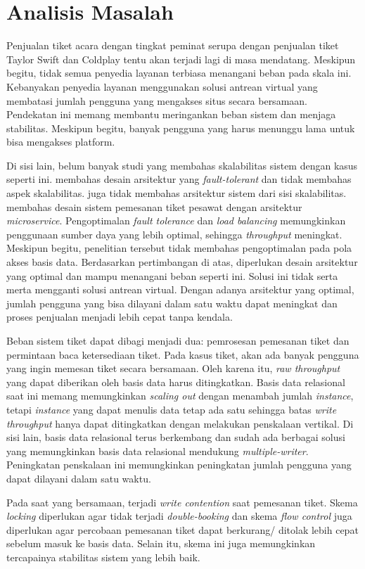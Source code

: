 
\section{Analisis Masalah}

Penjualan tiket acara dengan tingkat peminat serupa dengan penjualan tiket Taylor Swift dan Coldplay tentu akan terjadi lagi di masa mendatang. Meskipun begitu, tidak semua penyedia layanan terbiasa menangani beban pada skala ini. Kebanyakan penyedia layanan menggunakan solusi antrean virtual yang membatasi jumlah pengguna yang mengakses situs secara bersamaan. Pendekatan ini memang membantu meringankan beban sistem dan menjaga stabilitas. Meskipun begitu, banyak pengguna yang harus menunggu lama untuk bisa mengakses platform.

Di sisi lain, belum banyak studi yang membahas skalabilitas sistem dengan kasus seperti ini. \cite{microservicesEventDriven} membahas desain arsitektur yang \textit{fault-tolerant} dan tidak membahas aspek skalabilitas. \cite{backendForTicketing} juga tidak membahas arsitektur sistem dari sisi skalabilitas. \cite{barua2024enhancingresiliencescalabilitytravel} membahas desain sistem pemesanan tiket pesawat dengan arsitektur \textit{microservice}. Pengoptimalan \textit{fault tolerance} dan \textit{load balancing} memungkinkan penggunaan sumber daya yang lebih optimal, sehingga \textit{throughput} meningkat. Meskipun begitu, penelitian tersebut tidak membahas pengoptimalan pada pola akses basis data. Berdasarkan pertimbangan di atas, diperlukan desain arsitektur yang optimal dan mampu menangani beban seperti ini. Solusi ini tidak serta merta mengganti solusi antrean virtual. Dengan adanya arsitektur yang optimal, jumlah pengguna yang bisa dilayani dalam satu waktu dapat meningkat dan proses penjualan menjadi lebih cepat tanpa kendala.

Beban sistem tiket dapat dibagi menjadi dua: pemrosesan pemesanan tiket dan permintaan baca ketersediaan tiket. Pada kasus tiket, akan ada banyak pengguna yang ingin memesan tiket secara bersamaan. Oleh karena itu, \textit{raw throughput} yang dapat diberikan oleh basis data harus ditingkatkan. Basis data relasional saat ini memang memungkinkan \textit{scaling out} dengan menambah jumlah \textit{instance}, tetapi \textit{instance} yang dapat menulis data tetap ada satu sehingga batas \textit{write throughput} hanya dapat ditingkatkan dengan melakukan penskalaan vertikal. Di sisi lain, basis data relasional terus berkembang dan sudah ada berbagai solusi yang memungkinkan basis data relasional mendukung \textit{multiple-writer}. Peningkatan penskalaan ini memungkinkan peningkatan jumlah pengguna yang dapat dilayani dalam satu waktu.

Pada saat yang bersamaan, terjadi \textit{write contention} saat pemesanan tiket. Skema \textit{locking} diperlukan agar tidak terjadi \textit{double-booking} dan skema \textit{flow control} juga diperlukan agar percobaan pemesanan tiket dapat berkurang/ ditolak lebih cepat sebelum masuk ke basis data. Selain itu, skema ini juga memungkinkan tercapainya stabilitas sistem yang lebih baik.